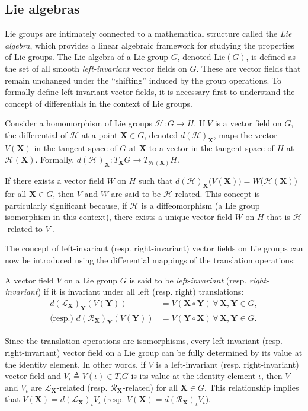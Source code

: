 \subsection{Lie algebras}
Lie groups are intimately connected to a mathematical structure called the \emph{Lie algebra}, which provides a linear algebraic framework for studying the properties of Lie groups. The Lie algebra of a Lie group $G$, denoted $\text{Lie}(G)$, is defined as the set of all smooth \emph{left-invariant} vector fields on $G$. These are vector fields that remain unchanged under the ``shifting'' induced by the group operations. To formally define left-invariant vector fields, it is necessary first to understand the concept of differentials in the context of Lie groups.

Consider a homomorphism of Lie groups $\mathcal{H}:G\to H$. If $V$ is a vector field on $G$, the differential of $\mathcal{H}$ at a point $\mathbf{X}\in G$, denoted $d(\mathcal{H})_\mathbf{X}$, maps the vector $V(\mathbf{X})$ in the tangent space of $G$ at $\mathbf{X}$ to a vector in the tangent space of $H$ at $\mathcal{H}(\mathbf{X})$. Formally, $d(\mathcal{H})_\mathbf{X}:T_\mathbf{X}G\to T_{\mathcal{H}(\mathbf{X})}H$.

If there exists a vector field $W$ on $H$ such that $d(\mathcal{H})_\mathbf{X}\bigl(V(\mathbf{X})\bigr) = W\bigl(\mathcal{H}(\mathbf{X})\bigr)$ for all $\mathbf{X}\in G$, then $V$ and $W$ are said to be $\mathcal{H}$-related. This concept is particularly significant because, if $\mathcal{H}$ is a diffeomorphism (a Lie group isomorphism in this context), there exists a unique vector field $W$ on $H$ that is $\mathcal{H}$-related to $V$ \citep[p. 183]{Lee2012}.

The concept of left-invariant (resp. right-invariant) vector fields on Lie groups can now be introduced using the differential mappings of the translation operations:
\begin{definition}
    A vector field $V$ on a Lie group $G$ is said to be \emph{left-invariant} (resp. \emph{right-invariant}) if it is invariant under all left (resp. right) translations:
    \begin{align*}
        d(\mathcal{L}_\mathbf{X})_\mathbf{Y}(V(\mathbf{Y})) &= V(\mathbf{X}\circ\mathbf{Y}) \,\forall\,\mathbf{X},\mathbf{Y}\in G,\\
        \text{(resp.) }d(\mathcal{R}_\mathbf{X})_\mathbf{Y}(V(\mathbf{Y})) &= V(\mathbf{Y}\circ\mathbf{X}) \,\forall\,\mathbf{X},\mathbf{Y}\in G.
    \end{align*}  
\end{definition}
Since the translation operations are isomorphisms, every left-invariant (resp. right-invariant) vector field on a Lie group can be fully determined by its value at the identity element. In other words, if $V$ is a left-invariant (resp. right-invariant) vector field and $V_\iota\triangleq V(\iota) \in T_\iota G$ is its value at the identity element $\iota$, then $V$ and $V_\iota$ are $\mathcal{L}_\mathbf{X}$-related (resp. $\mathcal{R}_\mathbf{X}$-related) for all $\mathbf{X}\in G$. This relationship implies that $V(\mathbf{X}) = d(\mathcal{L}_\mathbf{X})_\iota V_\iota$ (resp. $V(\mathbf{X}) = d(\mathcal{R}_\mathbf{X})_\iota V_\iota$).


